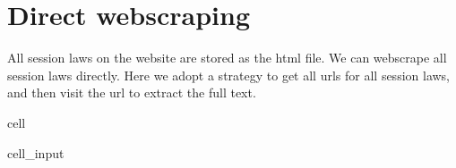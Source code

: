 \documentclass[letterpaper,10pt,english]{jupyterBook}
\begin{document}
\section{Direct webscraping}
\label{\detokenize{ch43:direct-webscraping}}
\sphinxAtStartPar
All session laws on the website are stored as the html file. We can webscrape all session laws directly. Here we adopt a strategy to get all urls for all session laws, and then visit the url to extract the full text.

\begin{sphinxuseclass}{cell}\begin{sphinxVerbatimInput}

\begin{sphinxuseclass}{cell_input}
\begin{sphinxVerbatim}[commandchars=\\\{\}]
  


\end{sphinxVerbatim}
\end{sphinxuseclass}
\end{sphinxVerbatimInput}
\end{sphinxuseclass}
\end{document}
